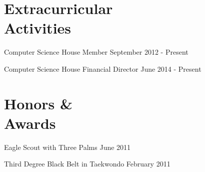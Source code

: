 \documentclass[letterpaper,margin,line,11pt]{resume}
\begin{document}
\begin{resume}
\section{\mysidestyle Extracurricular \\ Activities}
    \begin{asparablank}
        \item Computer Science House Member \hfill September 2012 - Present
        \item Computer Science House Financial Director \hfill June 2014 - Present
    \end{asparablank}
\section{\mysidestyle Honors \& \\ Awards}
    \begin{asparablank}
        \item Eagle Scout with Three Palms \hfill June 2011
        \item Third Degree Black Belt in Taekwondo \hfill February 2011
    \end{asparablank}

\end{resume}
\end{document}
